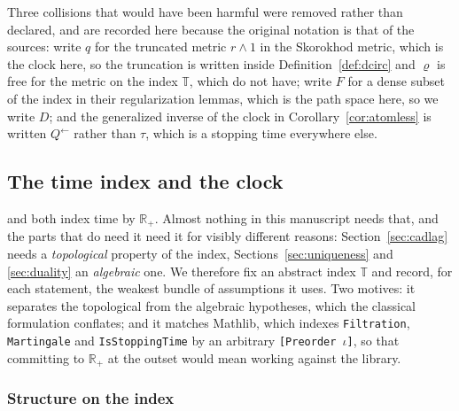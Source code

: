 \documentclass[11pt,a4paper]{article}
\theoremstyle{plain}
\theoremstyle{definition}
\theoremstyle{remark}
\newcommand{\R}{\mathbb{R}}
\newcommand{\Rp}{\R_+}
\newcommand{\T}{\mathbb{T}}                     %
\newcommand{\EK}{\cite{EK86}}
\newcommand{\CPS}{\cite{CPS23}}
\begin{document}
\medskip
\noindent
Three collisions that would have been harmful were removed rather than declared,
and are recorded here because the original notation is that of the sources:
\EK{} write $q$ for the truncated metric $r \wedge 1$ in the Skorokhod metric,
which is the clock here, so the truncation is written inside
Definition~\ref{def:dcirc} and $\varrho$ is free for the metric on the index
$\T$, which \EK{} do not have; \EK{} write $F$ for a dense
subset of the index in their regularization lemmas, which is the path space
here, so we write $D$; and the generalized inverse of the clock in
Corollary~\ref{cor:atomless} is written $Q^{\leftarrow}$ rather than $\tau$,
which is a stopping time everywhere else.

\subsection{The time index and the clock}
\label{ssec:timeindex}

\EK{} and \CPS{} both index time by $\Rp$.  Almost nothing in this manuscript
needs that, and the parts that do need it need it for visibly different reasons:
Section~\ref{sec:cadlag} needs a \emph{topological} property of the index,
Sections~\ref{sec:uniqueness} and \ref{sec:duality} an \emph{algebraic} one.  We
therefore fix an abstract index $\T$ and record, for each statement, the weakest
bundle of assumptions it uses.  Two motives: it separates the topological from
the algebraic hypotheses, which the classical formulation conflates; and it
matches Mathlib, which indexes \texttt{Filtration}, \texttt{Martingale} and
\texttt{IsStoppingTime} by an arbitrary \texttt{[Preorder \(\iota\)]}, so that
committing to $\Rp$ at the outset would mean working against the library.

\subsubsection*{Structure on the index}
\end{document}

